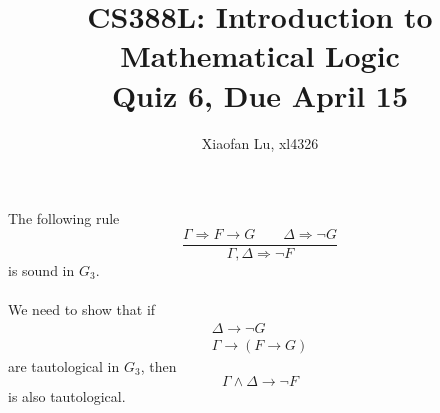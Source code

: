 \documentclass[12pt]{article}
\begin{document}
\title{CS388L: Introduction to Mathematical Logic \\ Quiz 6, Due April 15}
\author{Xiaofan Lu, xl4326}
\date{\vspace{-3ex}}
\maketitle

\noindent
The following rule 
\begin{equation*}
\frac{\Gamma \Rightarrow F \rightarrow G \qquad \Delta \Rightarrow \neg G}{\Gamma, \Delta \Rightarrow \neg F}
\end{equation*}
is sound in $G_3$. \\\\
\noindent
We need to show that if 
\begin{eqnarray}
\label{delta}
\Delta \rightarrow \neg G \\
\label{gamma}
\Gamma \rightarrow (F \rightarrow G)
\end{eqnarray}
are tautological in $G_3$, then
\begin{equation}
\Gamma \wedge \Delta \rightarrow \neg F
\end{equation}
is also tautological. 
\end{document}
